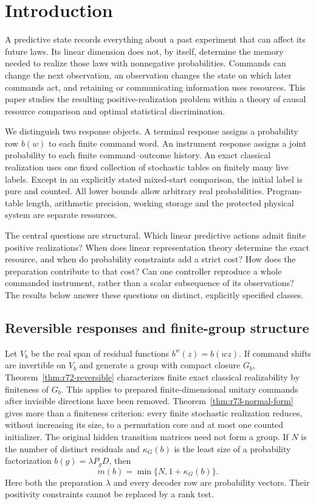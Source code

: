\section{Introduction}\label{sec:current-overview}\label{sec:introduction}
A predictive state records everything about a past experiment that can
affect its future laws. Its linear dimension does not, by itself, determine
the memory needed to realize those laws with nonnegative probabilities.
Commands can change the next observation, an observation changes the state
on which later commands act, and retaining or communicating information
uses resources. This paper studies the resulting positive-realization
problem within a theory of causal resource comparison and optimal
statistical discrimination.

We distinguish two response objects. A terminal response assigns a
probability row $b(w)$ to each finite command word. An instrument response
assigns a joint probability to each finite command--outcome history. An
exact classical realization uses one fixed collection of stochastic tables
on finitely many live labels. Except in an explicitly stated mixed-start
comparison, the initial label is pure and counted. All lower bounds allow
arbitrary real probabilities. Program-table length, arithmetic precision,
working storage and the protected physical system are separate resources.

The central questions are structural. Which linear predictive actions
admit finite positive realizations? When does linear representation theory
determine the exact resource, and when do probability constraints add a
strict cost? How does the preparation contribute to that cost? Can one
controller reproduce a whole commanded instrument, rather than a scalar
subsequence of its observations? The results below answer these questions
on distinct, explicitly specified classes.

\subsection*{Reversible responses and finite-group structure}
Let $V_b$ be the real span of residual functions $b^w(z)=b(wz)$.
If command shifts are invertible on $V_b$ and generate a group with compact
closure $G_b$, Theorem~\ref{thm:r72-reversible} characterizes finite exact
classical realizability by finiteness of $G_b$. This applies to prepared
finite-dimensional unitary commands after invisible directions have been
removed. Theorem~\ref{thm:r73-normal-form} gives more than a finiteness
criterion: every finite stochastic realization reduces, without increasing
its size, to a permutation core and at most one counted initializer.
The original hidden transition matrices need not form a group. If $N$ is
the number of distinct residuals and $\kappa_G(b)$ is the least size of a
probability factorization $b(g)=\lambda P_gD$, then
\begin{equation}\label{eq:r75-intro-core}
 m(b)=\min\{N,1+\kappa_G(b)\}.
\end{equation}
Here both the preparation $\lambda$ and every decoder row are probability
vectors. Their positivity constraints cannot be replaced by a rank test.

